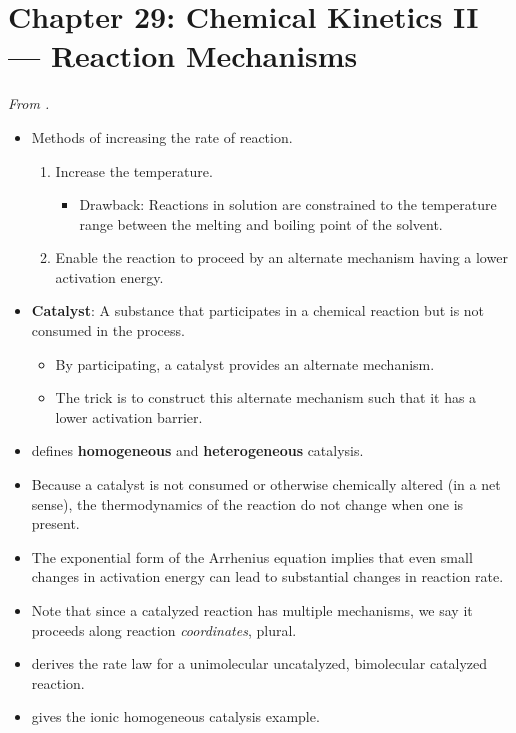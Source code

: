 \documentclass[../notes.tex]{subfiles}
\begin{document}
\section{Chapter 29: Chemical Kinetics II --- Reaction Mechanisms}
\emph{From \textcite{bib:McQuarrieSimon}.}
\begin{itemize}
    \item {}Methods of increasing the rate of reaction.
    \begin{enumerate}
        \item Increase the temperature.
        \begin{itemize}
            \item Drawback: Reactions in solution are constrained to the temperature range between the melting and boiling point of the solvent.
        \end{itemize}
        \item Enable the reaction to proceed by an alternate mechanism having a lower activation energy.
    \end{enumerate}
    \item \textbf{Catalyst}: A substance that participates in a chemical reaction but is not consumed in the process.
    \begin{itemize}
        \item By participating, a catalyst provides an alternate mechanism.
        \item The trick is to construct this alternate mechanism such that it has a lower activation barrier.
    \end{itemize}
    \item \textcite{bib:McQuarrieSimon} defines \textbf{homogeneous} and \textbf{heterogeneous} catalysis.
    \item Because a catalyst is not consumed or otherwise chemically altered (in a net sense), the thermodynamics of the reaction do not change when one is present.
    \item The exponential form of the Arrhenius equation implies that even small changes in activation energy can lead to substantial changes in reaction rate.
    \item Note that since a catalyzed reaction has multiple mechanisms, we say it proceeds along reaction \emph{coordinates}, plural.
    \item \textcite{bib:McQuarrieSimon} derives the rate law for a unimolecular uncatalyzed, bimolecular catalyzed reaction.
    \item \textcite{bib:McQuarrieSimon} gives the ionic homogeneous catalysis example.

\end{itemize}
\end{document}
